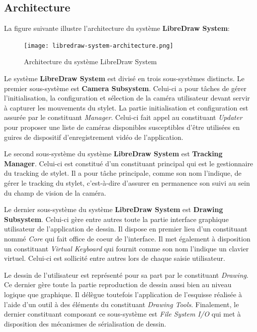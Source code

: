 \documentclass[11pt,a4paper,oldfontcommands]{memoir}
\begin{document}
\newpage

\subsection{Architecture}

La figure suivante illustre l'architecture du système \textbf{LibreDraw System}:

\begin{figure}[H]
\centering
\texttt{[image: libredraw-system-architecture.png]}
\caption{Architecture du système LibreDraw System}
\end{figure}

Le système \textbf{LibreDraw System} est divisé en trois sous-systèmes distincts. Le premier sous-système est \textbf{Camera Subsystem}. Celui-ci a pour tâches de gérer l'initialisation, la configuration et sélection de la caméra utilisateur devant servir à capturer les mouvements du stylet. La partie initialisation et configuration est assurée par le constituant \textit{Manager}. Celui-ci fait appel au constituant \textit{Updater} pour proposer une liste de caméras disponibles susceptibles d'être utilisées en guires de dispositif d'enregistrement vidéo de l'application.

Le second sous-système du système \textbf{LibreDraw System} est \textbf{Tracking Manager}. Celui-ci est constitué d'un constituant principal qui est le gestionnaire du tracking de stylet. Il a pour tâche principale, comme son nom l'indique, de gérer le tracking du stylet, c'est-à-dire d'assurer en permanence son suivi au sein du champ de vision de la caméra.

Le dernier sous-système du système \textbf{LibreDraw System} est \textbf{Drawing Subsystem}. Celui-ci gère entre autres toute la partie interface graphique utilisateur de l'application de dessin. Il dispose en premier lieu d'un constituant nommé \textit{Core} qui fait office de coeur de l'interface. Il met également à disposition un constituant \textit{Virtual Keyboard} qui fournit comme son nom l'indique un clavier virtuel. Celui-ci est sollicité entre autres lors de chaque saisie utilisateur. 

Le dessin de l'utilisateur est représenté pour sa part par le constituant \textit{Drawing}. Ce dernier gère toute la partie reproduction de dessin aussi bien au niveau logique que graphique. Il délègue toutefois l'application de l'esquisse réalisée à l'aide d'un outil à des éléments du constituant \textit{Drawing Tools}. Finalement, le dernier constituant composant ce sous-système est \textit{File System I/O} qui met à disposition des mécanismes de sérialisation de dessin.
\end{document}
